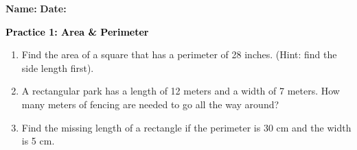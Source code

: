 \documentclass[12pt, letterpaper, fleqn]{article}
\begin{document}
\textbf{Name:} \underline{\hspace{5cm}}
\hfill
\textbf{Date:} \underline{\hspace{3cm}}\\

\begin{tcolorbox}[colback=customteal!20]
    \large\textcolor{black}{\textbf{Practice 1: Area \& Perimeter}}
\end{tcolorbox}
\begin{enumerate}[itemsep=3.5cm, leftmargin=0.6cm]
\item Find the area of a square that has a perimeter of 28 inches. (Hint: find the side length first).
\vspace{3.5cm}
\item A rectangular park has a length of 12 meters and a width of 7 meters. How many meters of fencing are needed to go all the way around?
\vspace{3.5cm}
\item Find the missing length of a rectangle if the perimeter is 30 cm and the width is 5 cm.
\end{enumerate}
\end{document}
